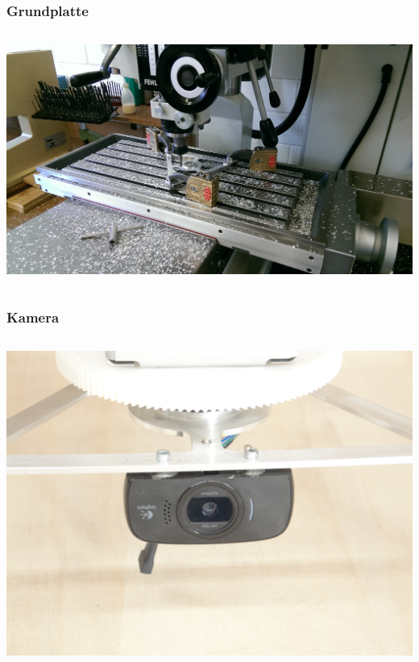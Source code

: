 \begin{frame}
    \frametitle{Grundplatte}
    \begin{columns}
        \begin{column}{0.9\textwidth}
            \centering
            \includegraphics[width=1.0\textwidth]{FotosM/Bild2.jpg}
        \end{column}
    \end{columns}
\end{frame}
\begin{frame}
    \frametitle{Kamera}
    \begin{columns}
        \begin{column}{0.9\textwidth}
            \centering
            \includegraphics[width=1.0\textwidth]{../doc/fig/DSC02993.JPG}
        \end{column}
    \end{columns}
\end{frame}
